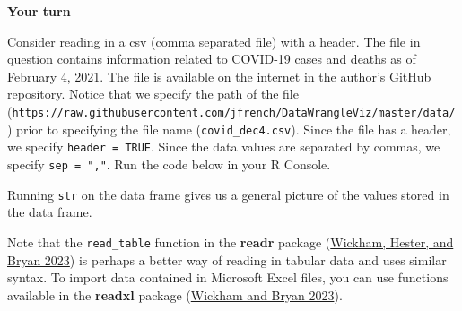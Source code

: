 \documentclass[
]{book}
\newenvironment{Shaded}{\begin{snugshade}}{\end{snugshade}}
\newcommand{\AttributeTok}[1]{\textcolor[rgb]{0.77,0.63,0.00}{#1}}
\newcommand{\CommentTok}[1]{\textcolor[rgb]{0.56,0.35,0.01}{\textit{#1}}}
\newcommand{\ConstantTok}[1]{\textcolor[rgb]{0.00,0.00,0.00}{#1}}
\newcommand{\DocumentationTok}[1]{\textcolor[rgb]{0.56,0.35,0.01}{\textbf{\textit{#1}}}}
\newcommand{\FunctionTok}[1]{\textcolor[rgb]{0.00,0.00,0.00}{#1}}
\newcommand{\NormalTok}[1]{#1}
\newcommand{\OtherTok}[1]{\textcolor[rgb]{0.56,0.35,0.01}{#1}}
\newcommand{\StringTok}[1]{\textcolor[rgb]{0.31,0.60,0.02}{#1}}
\theoremstyle{definition}
\theoremstyle{definition}
\theoremstyle{definition}
\theoremstyle{definition}
\theoremstyle{remark}
\begin{document}
\begin{yourturn}
\textbf{Your turn}

Consider reading in a csv (comma separated file) with a header. The file in question contains information related to COVID-19 cases and deaths as of February 4, 2021. The file is available on the internet in the author's GitHub repository. Notice that we specify the path of the file (\texttt{https://raw.githubusercontent.com/jfrench/DataWrangleViz/master/data/}) prior to specifying the file name (\texttt{covid\_dec4.csv}). Since the file has a header, we specify \texttt{header\ =\ TRUE}. Since the data values are separated by commas, we specify \texttt{sep\ =\ ","}. Run the code below in your R Console.

\begin{Shaded}
\end{Shaded}

Running \texttt{str} on the data frame gives us a general picture of the values stored in the data frame.

\end{yourturn}

Note that the \texttt{read\_table} function in the \textbf{readr} package (\protect\hyperlink{ref-R-readr}{Wickham, Hester, and Bryan 2023}) is perhaps a better way of reading in tabular data and uses similar syntax. To import data contained in Microsoft Excel files, you can use functions available in the \textbf{readxl} package (\protect\hyperlink{ref-R-readxl}{Wickham and Bryan 2023}).
\end{document}
